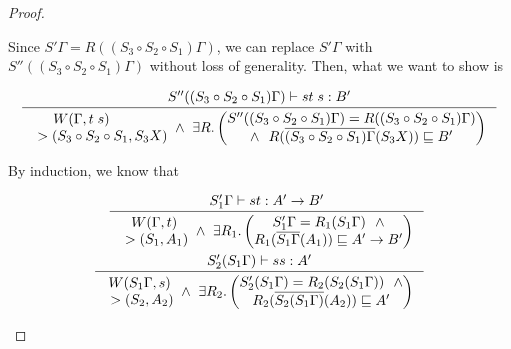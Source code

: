 \begin{proof}
\begin{itemize}
	Since $S'\Gamma=R((S_3\circ S_2\circ S_1)\Gamma)$,
	we can replace $S'\Gamma$ with $S''((S_3\circ S_2\circ S_1)\Gamma)$
	without loss of generality. Then, what we want to show is
	\vspace*{-2em}
	\begin{singlespace}
	\[\inference{S''((S_3\circ S_2\circ S_1)\Gamma) |-s t\;s : B'}{
	\begin{matrix} W(\Gamma,t\;s) ~\qquad~ \\
		~> (S_3\circ S_2\circ S_1,S_3 X) \end{matrix}
	~\land~
	\exists R.
	\left(\begin{matrix}
		S''((S_3\circ S_2\circ S_1)\Gamma)=R((S_3\circ S_2\circ S_1)\Gamma)
		\\ \land ~~
		R(\overline{(S_3\circ S_2\circ S_1)\Gamma}(S_3 X)) \sqsubseteq B'
	\end{matrix}\right) } \]
	\end{singlespace}

	By induction, we know that \vspace*{-2em}
	\begin{singlespace}
	\begin{align}
	\label{WcompleteAppsCase1}
	\inference{S_1'\Gamma |-s t : A' -> B'}{
	\begin{matrix} W(\Gamma,t) \\ ~> (S_1,A_1) \end{matrix}
	~\land~ 
	\exists R_1.
		\left(\begin{matrix}
			S_1'\Gamma=R_1(S_1\Gamma) ~~\land\\
			R_1(\overline{S_1\Gamma}(A_1))
			\sqsubseteq A' -> B'
		\end{matrix}\right) }
	\\
	\label{WcompleteAppsCase2}
	\inference{S_2'(S_1\Gamma) |-s s : A'}{
	\begin{matrix} W(S_1\Gamma,s) \\ ~> (S_2,A_2) \end{matrix}
	~\land~
	\exists R_2.
		\left(\begin{matrix}
			S_2'(S_1\Gamma)=R_2(S_2(S_1\Gamma)) ~~\land\\
			R_2(\overline{S_2(S_1\Gamma)}(A_2))
			\sqsubseteq A'
		\end{matrix}\right) }
	\end{align}
	\end{singlespace}


\end{itemize}
\end{proof}
